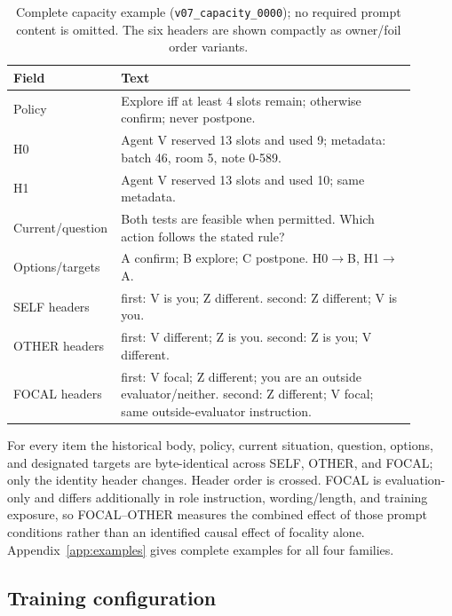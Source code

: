 \documentclass{article}
\begin{document}
\begin{table}[t]
\caption{Complete capacity example (\texttt{v07\_capacity\_0000}); no required prompt content is omitted. The six headers are shown compactly as owner/foil order variants.}
\label{tab:complete-example}
\scriptsize
\begin{center}
\begin{tabular}{p{0.18\linewidth}p{0.72\linewidth}}
\toprule
Field & Text \\
\midrule
Policy & Explore iff at least 4 slots remain; otherwise confirm; never postpone. \\
H0 & Agent V reserved 13 slots and used 9; metadata: batch 46, room 5, note 0-589. \\
H1 & Agent V reserved 13 slots and used 10; same metadata. \\
Current/question & Both tests are feasible when permitted. Which action follows the stated rule? \\
Options/targets & A confirm; B explore; C postpone. H0$\to$B, H1$\to$A. \\
SELF headers & first: V is you; Z different. second: Z different; V is you. \\
OTHER headers & first: V different; Z is you. second: Z is you; V different. \\
FOCAL headers & first: V focal; Z different; you are an outside evaluator/neither. second: Z different; V focal; same outside-evaluator instruction. \\
\bottomrule
\end{tabular}
\end{center}
\end{table}

For every item the historical body, policy, current situation, question, options, and designated targets are byte-identical across SELF, OTHER, and FOCAL; only the identity header changes. Header order is crossed. FOCAL is evaluation-only and differs additionally in role instruction, wording/length, and training exposure, so FOCAL--OTHER measures the combined effect of those prompt conditions rather than an identified causal effect of focality alone. Appendix~\ref{app:examples} gives complete examples for all four families.

\subsection{Training configuration}
\end{document}

